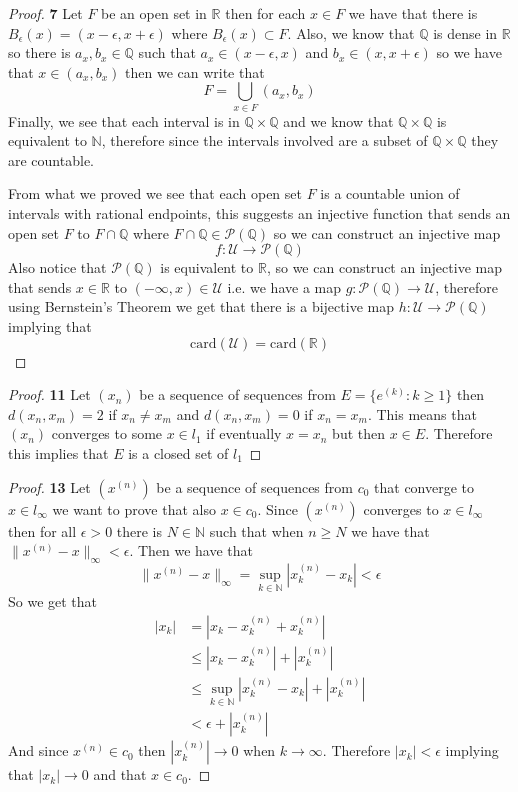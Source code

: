 \documentclass[11pt]{article}
\newcommand{\N}{\mathbb{N}}
\newcommand{\Q}{\mathbb{Q}}
\newcommand{\R}{\mathbb{R}}
\theoremstyle{definition}
\begin{document}
\cleardoublepage
	\begin{proof}{\textbf{7}}
        Let $F$ be an open set in $\R$ then for each $x \in F$ we have that there is
        $B_\epsilon(x) = (x-\epsilon, x+\epsilon)$ where $B_\epsilon(x) \subset F$. Also,
        we know that $\Q$ is dense in $\R$ so there is $a_x,b_x \in \Q$
        such that $a_x \in (x-\epsilon, x)$ and $b_x \in (x, x + \epsilon)$ so we have
        that $x \in (a_x, b_x)$ then we can write that
        $$F = \bigcup_{x \in F} (a_x,b_x)$$
        Finally, we see that each interval is in $\Q \times \Q$ and we know that
        $\Q \times \Q$ is equivalent to $\N$, therefore since the intervals involved are
        a subset of $\Q \times \Q$ they are countable.
        
        From what we proved we see that each open set $F$ is a countable union of
        intervals with rational endpoints, this suggests an injective function that
        sends an open set $F$ to  $F\cap\Q$ where $F \cap \Q \in \mathcal{P}(\Q)$
        so we can construct an injective map
        $$f: \mathcal{U} \to \mathcal{P}(\Q)$$
        Also notice that $\mathcal{P}(\Q)$ is equivalent to $\R$, so we can construct an
        injective map that sends $x \in \R$ to $(-\infty, x) \in\mathcal{U}$ i.e.
        we have a map $g: \mathcal{P}(\Q) \to \mathcal{U}$,
        therefore using Bernstein's Theorem we get that there is a bijective map
        $h:\mathcal{U} \to \mathcal{P}(\Q)$ implying that
        $$\text{card}(\mathcal{U}) = \text{card}(\R)$$
    \end{proof}
	\begin{proof}{\textbf{11}}
        Let $(x_n)$ be a sequence of sequences from $E = \{e^{(k)}: k\geq 1\}$ then
        $d(x_n, x_m) = 2$ if $x_n \neq x_m$ and $d(x_n, x_m) = 0 $ if $x_n = x_m$. This
        means that $(x_n)$ converges to some $x \in l_1$ if eventually $x = x_n$ but
        then $x \in E$. Therefore this implies that $E$ is a closed set of $l_1$ 
    \end{proof}
	\begin{proof}{\textbf{13}}
        Let $(x^{(n)})$ be a sequence of sequences from $c_0$ that converge to
        $x \in l_\infty$ we want to prove that also $x \in c_0$.
        Since $(x^{(n)})$ converges to $x \in l_\infty$ then for all $\epsilon > 0$ 
        there is $N \in \N$ such that when $n \geq N$ we have that
        $\|x^{(n)} - x\|_\infty < \epsilon$.
        Then we have that
        $$\|x^{(n)} - x\|_\infty = \sup_{k \in \N}|x^{(n)}_k - x_k|< \epsilon$$
        So we get that
        \begin{align*}
            |x_k| &= |x_k - x_k^{(n)} + x_k^{(n)}|\\
            &\leq |x_k - x_k^{(n)}| + |x_k^{(n)}|\\
            &\leq \sup_{k \in \N}|x^{(n)}_k - x_k| + |x^{(n)}_k|\\
            &< \epsilon + |x^{(n)}_k|
        \end{align*}
        And since $x^{(n)} \in c_0$ then $|x^{(n)}_k| \to 0$ when $k \to \infty$.
        Therefore $|x_k| < \epsilon$ implying that $|x_k| \to 0$ and that $x \in c_0$. 
    \end{proof}
\end{document}
